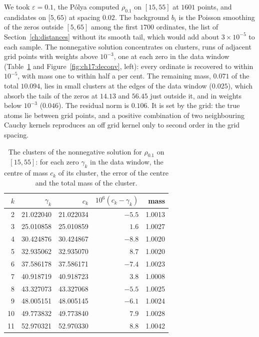 We took $\varepsilon=0.1$, the P\'olya computed $\rho_{0.1}$ on $[15,55]$ at $1601$ points, and candidates on $[5,65)$ at spacing $0.02$. The background $b_i$ is the Poisson smoothing of the zeros outside $[5,65]$ among the first $1700$ ordinates, the list of Section~\ref{ch:distances} without its smooth tail, which would add about $3\times10^{-5}$ to each sample. The nonnegative solution concentrates on clusters, runs of adjacent grid points with weights above $10^{-3}$, one at each zero in the data window (Table~\ref{tab:ch17:atoms} and Figure~\ref{fig:ch17:deconv}, left): every ordinate is recovered to within $10^{-5}$, with mass one to within half a per cent. The remaining mass, $0.071$ of the total $10.094$, lies in small clusters at the edges of the data window ($0.025$), which absorb the tails of the zeros at $14.13$ and $56.45$ just outside it, and in weights below $10^{-3}$ ($0.046$). The residual norm is $0.106$. It is set by the grid: the true atoms lie between grid points, and a positive combination of two neighbouring Cauchy kernels reproduces an off grid kernel only to second order in the grid spacing.

\begin{table}[htbp]
\centering\small
\begin{tabular}{rrrrr}
\toprule
$k$ & $\gamma_k$ & $c_k$ & $10^6(c_k-\gamma_k)$ & mass\\
\midrule
2 & 21.022040 & 21.022034 & $-5.5$ & 1.0013\\
3 & 25.010858 & 25.010859 & $1.6$ & 1.0027\\
4 & 30.424876 & 30.424867 & $-8.8$ & 1.0020\\
5 & 32.935062 & 32.935070 & $8.7$ & 1.0020\\
6 & 37.586178 & 37.586171 & $-7.4$ & 1.0023\\
7 & 40.918719 & 40.918723 & $3.8$ & 1.0008\\
8 & 43.327073 & 43.327068 & $-5.5$ & 1.0025\\
9 & 48.005151 & 48.005145 & $-6.1$ & 1.0024\\
10 & 49.773832 & 49.773840 & $7.9$ & 1.0028\\
11 & 52.970321 & 52.970330 & $8.8$ & 1.0042\\
\bottomrule
\end{tabular}
\caption{The clusters of the nonnegative solution for $\rho_{0.1}$ on $[15,55]$: for each zero $\gamma_k$ in the data window, the centre of mass $c_k$ of its cluster, the error of the centre and the total mass of the cluster.}
\label{tab:ch17:atoms}
\end{table}

